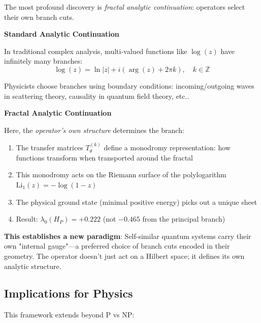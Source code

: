 \begin{level3}
The most profound discovery is \textit{fractal analytic continuation}: operators select their own branch cuts.

\textbf{Standard Analytic Continuation}

In traditional complex analysis, multi-valued functions like $\log(z)$ have infinitely many branches:
\begin{equation}
\log(z) = \ln|z| + i(\arg(z) + 2\pi k), \quad k \in \mathbb{Z}
\end{equation}

Physicists choose branches using boundary conditions: incoming/outgoing waves in scattering theory, causality in quantum field theory, etc.\cite{taylor1972}.

\textbf{Fractal Analytic Continuation}

Here, the \textit{operator's own structure} determines the branch:
\begin{enumerate}
\item The transfer matrices $T^{(k)}_\theta$ define a monodromy representation: how functions transform when transported around the fractal
\item This monodromy acts on the Riemann surface of the polylogarithm $\text{Li}_1(z) = -\log(1-z)$
\item The physical ground state (minimal positive energy) picks out a unique sheet
\item Result: $\lambda_0(H_P) = +0.222$ (not $-0.465$ from the principal branch)
\end{enumerate}

\textbf{This establishes a new paradigm}: Self-similar quantum systems carry their own "internal gauge"—a preferred choice of branch cuts encoded in their geometry. The operator doesn't just act on a Hilbert space; it defines its own analytic structure.
\end{level3}

\subsection{Implications for Physics}

This framework extends beyond P vs NP:

